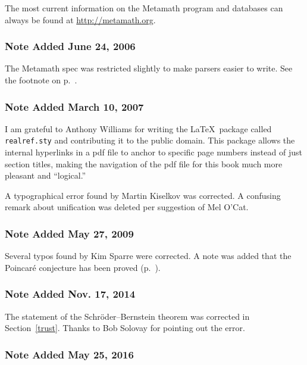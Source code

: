 The most current information on the Metamath program and databases can
always be found at \url{http://metamath.org}.


\subsubsection{Note Added June 24, 2006}\label{note2006}

The Metamath spec was restricted slightly to make parsers easier to
write.  See the footnote on p.~\pageref{namespace}.

\subsubsection{Note Added March 10, 2007}\label{note2006b}

I am grateful to Anthony Williams for writing
the \LaTeX\ package called {\tt realref.sty} and contributing it to the
public domain.  This package allows the internal hyperlinks in a {\sc
pdf} file to anchor to specific page numbers instead of just section
titles, making the navigation of the {\sc pdf} file for this book much
more pleasant and ``logical.''

A typographical error found by Martin Kiselkov was corrected.
A confusing remark about unification was deleted per suggestion of
Mel O'Cat.

\subsubsection{Note Added May 27, 2009}\label{note2009}

Several typos found by Kim Sparre were corrected.  A note was added that
the Poincar\'{e} conjecture has been proved (p.~\pageref{poincare}).

\subsubsection{Note Added Nov. 17, 2014}\label{note2014}

The statement of the Schr\"{o}der--Bernstein theorem was corrected in
Section~\ref{trust}.  Thanks to Bob Solovay for pointing out the error.

\subsubsection{Note Added May 25, 2016}\label{note2016}

